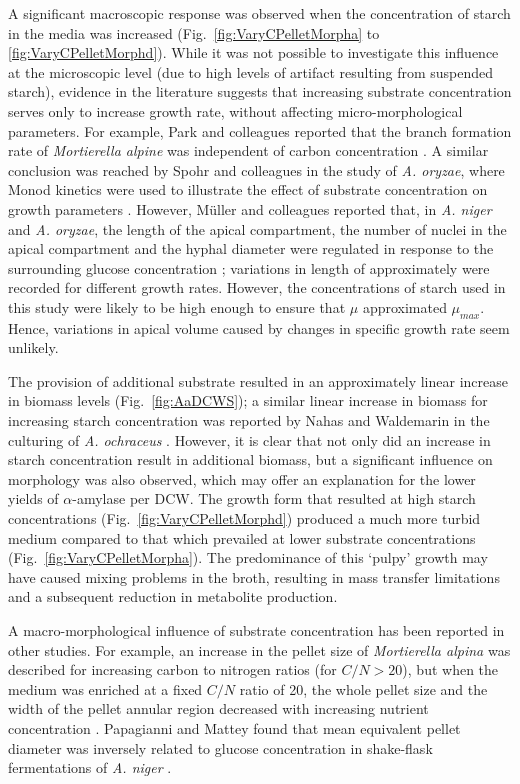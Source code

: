 A significant macroscopic response was observed when the concentration of starch in the media was increased (Fig.~\ref{fig:VaryCPelletMorpha} to \ref{fig:VaryCPelletMorphd}). While it was not possible to investigate this influence at the microscopic level (due to high levels of artifact resulting from suspended starch), evidence in the literature suggests that increasing substrate concentration serves only to increase growth rate, without affecting micro-morphological parameters. For example, Park and colleagues reported that the branch formation rate of \emph{Mortierella alpine} was independent of carbon concentration \cite{eypark2002}. A similar conclusion was reached by Spohr and colleagues in the study of \emph{A. oryzae}, where Monod kinetics were used to illustrate the effect of substrate concentration on growth parameters \cite{spohr1998}. However, M\"{u}ller and colleagues reported that, in \emph{A. niger} and \emph{A. oryzae}, the length of the apical compartment, the number of nuclei in the apical compartment and the hyphal diameter were regulated in response to the surrounding glucose concentration \cite{muller2000}; variations in length of approximately  were recorded for different growth rates. However, the concentrations of starch used in this study were likely to be high enough to ensure that $\mu$ approximated $\mu_{max}$. Hence, variations in apical volume caused by changes in specific growth rate seem unlikely.

The provision of additional substrate resulted in an approximately linear increase in biomass levels (Fig.~\ref{fig:AaDCWS}); a similar linear increase in biomass for increasing starch concentration was reported by Nahas and Waldemarin in the culturing of \emph{A. ochraceus} \cite{nahas2002}. However, it is clear that not only did an increase in starch concentration result in additional biomass, but a significant influence on morphology was also observed, which may offer an explanation for the lower yields of $\alpha$-amylase per DCW. The growth form that resulted at high starch concentrations (Fig.~\ref{fig:VaryCPelletMorphd}) produced a much more turbid medium compared to that which prevailed at lower substrate concentrations (Fig.~\ref{fig:VaryCPelletMorpha}). The predominance of this \lq pulpy' growth may have caused mixing problems in the broth, resulting in mass transfer limitations and a subsequent reduction in metabolite production.

A macro-morphological influence of substrate concentration has been reported in other studies. For example, an increase in the pellet size of \emph{Mortierella alpina} was described for increasing carbon to nitrogen ratios (for $C/N > 20$), but when the medium was enriched at a fixed $C/N$ ratio of 20, the whole pellet size and the width of the pellet annular region decreased with increasing nutrient concentration \cite{koike2001}. Papagianni and Mattey found that mean equivalent pellet diameter was inversely related to glucose concentration in shake-flask fermentations of \emph{A. niger} \cite{papagianni2004}.

